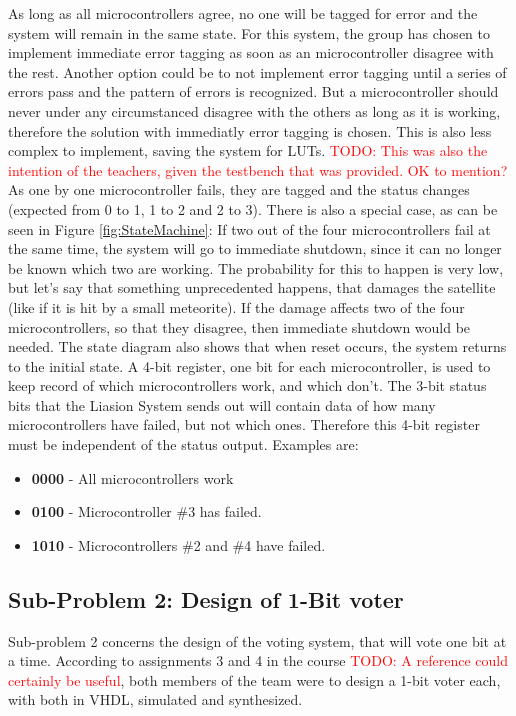 \documentclass[a4paper]{IEEEtran}
\newcommand\TODO[1]{\textcolor{red}{TODO:#1}}
\newcommand\todo[1]{\TODO{#1}}
\begin{document}
As long as all microcontrollers agree, no one will be tagged for error and the system will remain in the same state.
For this system, the group has chosen to implement immediate error tagging as soon as an microcontroller disagree with the rest.
Another option could be to not implement error tagging until a series of errors pass and the pattern of errors is recognized.
But a microcontroller should never under any circumstanced disagree with the others as long as it is working, therefore the solution with immediatly error tagging is chosen.
This is also less complex to implement, saving the system for LUTs.
\todo{ This was also the intention of the teachers, given the testbench that was provided. OK to mention?}
As one by one microcontroller fails, they are tagged and the status changes (expected from 0 to 1, 1 to 2 and 2 to 3).
There is also a special case, as can be seen in Figure \ref{fig:StateMachine}:
If two out of the four microcontrollers fail at the same time, the system will go to immediate shutdown, since it can no longer be known which two are working.
The probability for this to happen is very low, but let's say that something unprecedented happens, that damages the satellite (like if it is hit by a small meteorite).
If the damage affects two of the four microcontrollers, so that they disagree, then immediate shutdown would be needed.
The state diagram also shows that when reset occurs, the system returns to the initial state.
A 4-bit register, one bit for each microcontroller, is used to keep record of which microcontrollers work, and which don't.
The 3-bit status bits that the Liasion System sends out will contain data of how many microcontrollers have failed, but not which ones.
Therefore this 4-bit register must be independent of the status output.
Examples are:
\begin{itemize}
    \item \textbf{0000} - All microcontrollers work
    \item \textbf{0100} - Microcontroller \#3 has failed.
    \item \textbf{1010} - Microcontrollers \#2 and \#4 have failed.
\end{itemize}

\subsection{Sub-Problem 2: Design of 1-Bit voter}
Sub-problem 2 concerns the design of the voting system, that will vote one bit at a time.
According to assignments 3 and 4 in the course \todo{ A reference could certainly be useful}, both members of the team were to design a 1-bit voter each, with both in VHDL, simulated and synthesized.
\end{document}
